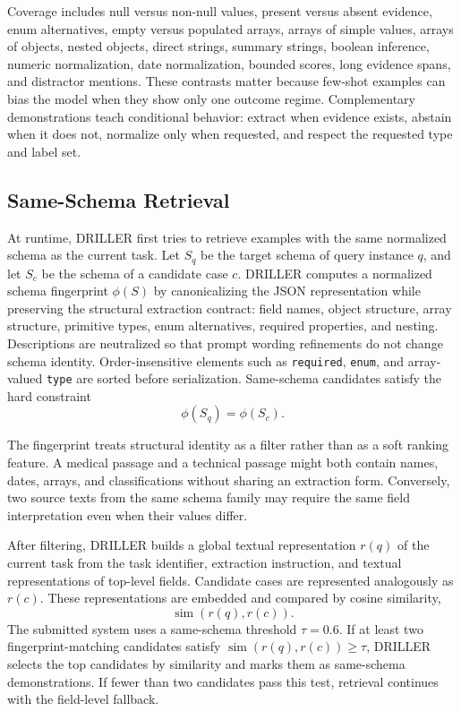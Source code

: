\FloatBarrier

Coverage includes null versus non-null values, present versus absent evidence, enum alternatives, empty versus populated arrays, arrays of simple values, arrays of objects, nested objects, direct strings, summary strings, boolean inference, numeric normalization, date normalization, bounded scores, long evidence spans, and distractor mentions. These contrasts matter because few-shot examples can bias the model when they show only one outcome regime. Complementary demonstrations teach conditional behavior: extract when evidence exists, abstain when it does not, normalize only when requested, and respect the requested type and label set.

\subsection{Same-Schema Retrieval}

At runtime, DRILLER first tries to retrieve examples with the same normalized schema as the current task. Let \(S_q\) be the target schema of query instance \(q\), and let \(S_c\) be the schema of a candidate case \(c\). DRILLER computes a normalized schema fingerprint \(\phi(S)\) by canonicalizing the JSON representation while preserving the structural extraction contract: field names, object structure, array structure, primitive types, enum alternatives, required properties, and nesting. Descriptions are neutralized so that prompt wording refinements do not change schema identity. Order-insensitive elements such as \texttt{required}, \texttt{enum}, and array-valued \texttt{type} are sorted before serialization. Same-schema candidates satisfy the hard constraint
\[
\phi(S_q)=\phi(S_c).
\]

The fingerprint treats structural identity as a filter rather than as a soft ranking feature. A medical passage and a technical passage might both contain names, dates, arrays, and classifications without sharing an extraction form. Conversely, two source texts from the same schema family may require the same field interpretation even when their values differ.

After filtering, DRILLER builds a global textual representation \(r(q)\) of the current task from the task identifier, extraction instruction, and textual representations of top-level fields. Candidate cases are represented analogously as \(r(c)\). These representations are embedded and compared by cosine similarity,
\[
\operatorname{sim}(r(q),r(c)).
\]
The submitted system uses a same-schema threshold \(\tau=0.6\). If at least two fingerprint-matching candidates satisfy \(\operatorname{sim}(r(q),r(c))\geq\tau\), DRILLER selects the top candidates by similarity and marks them as same-schema demonstrations. If fewer than two candidates pass this test, retrieval continues with the field-level fallback.

